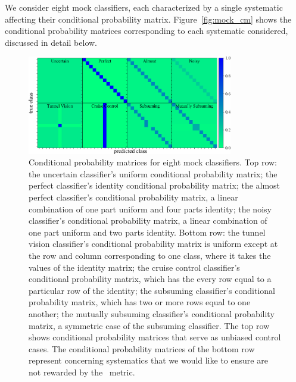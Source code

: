 We consider eight mock classifiers, each characterized by a single systematic affecting their conditional probability matrix.
Figure~\ref{fig:mock_cm} shows the conditional probability matrices corresponding to each systematic considered, discussed in detail below.
\begin{figure}
	\begin{center}
    \includegraphics[width=0.8\textwidth]{./fig/all_sim_cm.png}
		\caption{Conditional probability matrices for eight mock classifiers.
		Top row:
		the uncertain classifier's uniform conditional probability matrix;
		the perfect classifier's identity conditional probability matrix;
		the almost perfect classifier's conditional probability matrix, a linear combination of one part uniform and four parts identity;
		the noisy classifier's conditional probability matrix, a linear combination of one part uniform and two parts identity.
		Bottom row:
		the tunnel vision classifier's conditional probability matrix is uniform except at the row and column corresponding to one class, where it takes the values of the identity matrix;
		the cruise control classifier's conditional probability matrix, which has the every row equal to a particular row of the identity;
		the subsuming classifier's conditional probability matrix, which has two or more rows equal to one another;
		the mutually subsuming classifier's conditional probability matrix, a symmetric case of the subsuming classifier.
		The top row shows conditional probability matrices that serve as unbiased control cases.
		The conditional probability matrices of the bottom row represent concerning systematics that we would like to ensure are not rewarded by the \plasticc\ metric.
}
\end{center}
\end{figure}
